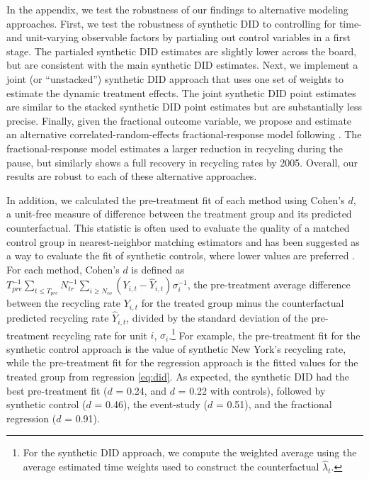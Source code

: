 \documentclass[12pt]{article}
\begin{document}
In the appendix, we test the robustness of our findings to alternative modeling approaches. First, we test the robustness of synthetic DID to controlling for time- and unit-varying observable factors by partialing out control variables in a first stage.  The partialed synthetic DID estimates are slightly lower across the board, but are consistent with the main synthetic DID estimates.  Next, we implement a joint (or ``unstacked'') synthetic DID approach that uses one set of weights to estimate the dynamic treatment effects.  The joint synthetic DID point estimates are similar to the stacked synthetic DID point estimates but are substantially less precise.  Finally, given the fractional outcome variable, we propose and estimate an alternative correlated-random-effects fractional-response model following \cite{papkewooldridge2008}.  The fractional-response model estimates a larger reduction in recycling during the pause, but similarly shows a full recovery in recycling rates by 2005.  Overall, our results are robust to each of these alternative approaches.

In addition, we calculated the pre-treatment fit of each method using Cohen's \(d\), a unit-free measure of difference between the treatment group and its predicted counterfactual.  This statistic is often used to evaluate the quality of a matched control group in nearest-neighbor matching estimators and has been suggested as a way to evaluate the fit of synthetic controls, where lower values are preferred \citep{hollingsworth_wing_2020}. For each method, Cohen's \(d\) is defined as \(T_{pre}^{-1}\sum_{t\leq T_{pre}} N_{tr}^{-1}\sum_{i \geq N_{co}} (Y_{i,t}-\hat{Y}_{i,t})\sigma_i^{-1}\), the pre-treatment average difference between the recycling rate \(Y_{i,t}\) for the treated group minus the counterfactual predicted recycling rate \(\hat{Y}_{i,t}\), divided by the standard deviation of the pre-treatment recycling rate for unit \(i\), \(\sigma_i\).\footnote{For the synthetic DID approach, we compute the weighted average using the average estimated time weights used to construct the counterfactual \(\hat{\lambda}_t\).}  For example, the pre-treatment fit for the synthetic control approach is the value of synthetic New York's recycling rate, while the pre-treatment fit for the regression approach is the fitted values for the treated group from regression \ref{eq:did}.  As expected, the synthetic DID had the best pre-treatment fit (\(d\) = 0.24, and \(d\) = 0.22 with controls), followed by synthetic control (\(d\) = 0.46), the event-study (\(d\) = 0.51), and the fractional regression (\(d\) = 0.91).
\end{document}
